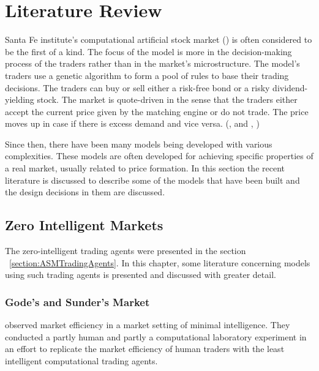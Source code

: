 \section{Literature Review}

Santa Fe institute's computational artificial stock %
market (\citeyear{SantaFe94}) is often considered to be the first of a kind. 
The focus of the model is more in the 
decision-making process of the traders rather than in the 
market's microstructure. The model's traders use a 
genetic algorithm to form a pool of rules to base
their trading decisions. The traders can buy or
sell either a risk-free bond or a risky dividend-yielding stock.
The market is quote-driven in the sense that the traders
either accept the current price given by the matching engine
or do not trade. The price moves up in case if there is excess
demand and vice versa. (\citeauthor{SantaFe94}, \citeyear{SantaFe94} 
and \citeauthor{SantaFe99}, \citeyear{SantaFe99})

Since then, there have been many models being 
developed with various complexities. These models are often developed
for achieving specific properties of a real market, 
usually related to price formation. In this section
the recent literature is discussed to describe some of the models 
that have been built and the design decisions in them are discussed.


\subsection{Zero Intelligent Markets}


The zero-intelligent trading agents were presented in the section 
~\ref{section:ASMTradingAgents}. In this chapter, some literature concerning 
models using such trading agents is presented and discussed with greater detail.

\subsubsection{Gode's and Sunder's Market}
\citet{God93} observed market efficiency in a market setting
of minimal intelligence. They conducted a partly human and partly
a computational laboratory experiment in an effort to replicate the market
efficiency of human traders with the least intelligent computational
trading agents. 

